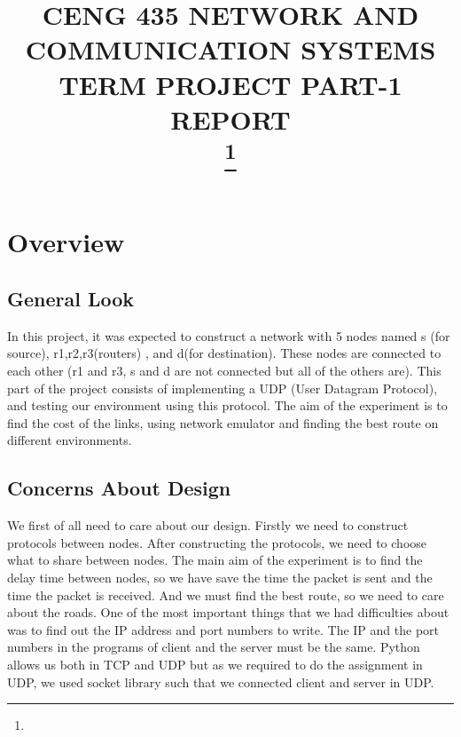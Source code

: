 \documentclass[conference]{IEEEtran}
\begin{document}
\title{CENG 435 NETWORK AND COMMUNICATION SYSTEMS TERM PROJECT PART-1 REPORT \\
{\footnotesize}
\thanks{}
}

\author{
\and
{}
}

\maketitle

\section{Overview}
\subsection{General Look}
In this project, it was expected to construct a network with 5 nodes named s (for source), r1,r2,r3(routers) , and d(for destination). These nodes are connected to each other (r1 and r3, s and d are not connected but all of the others are). This part of the project consists of implementing a UDP (User Datagram Protocol), and testing our environment using this protocol. The aim of the experiment is to find the cost of the links, using network emulator and finding the best route on different environments. 

\subsection{Concerns About Design}
We first of all need to care about our design. Firstly we need to construct protocols between nodes. After constructing the protocols, we need to choose what to share between nodes. The main aim of the experiment is to find the delay time between nodes, so we have save the time the packet is sent and the time the packet is received. And we must find the best route, so we need to care about the roads. One of the most important things that we had difficulties about was to find out the IP address and port numbers to write. The IP and the port numbers in the programs of client and the server must be the same. Python allows us both in TCP and UDP but as we required to do the assignment in UDP, we used socket library such that we connected client and server in UDP. 
\end{document}
